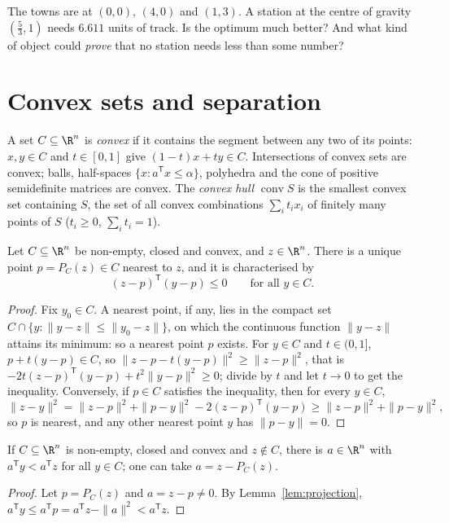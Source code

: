 \begin{think}
The towns are at $(0,0)$, $(4,0)$ and $(1,3)$. A station at the centre of gravity $(\frac53,1)$ needs $6.611$ units of track. Is the
optimum much better? And what kind of object could \emph{prove} that no station needs less than some number?
\end{think}

\section{Convex sets and separation}\label{sec:separation}

A set $C\subseteq\R^n$ is \emph{convex} if it contains the segment between any two of its points: $x,y\in C$ and $t\in[0,1]$ give $(1-t)x+ty\in C$. Intersections of convex
sets are convex; balls, half-spaces $\{x:a^{\mathsf T}x\le\alpha\}$, polyhedra and the cone of positive semidefinite matrices are convex. The \emph{convex hull} $\operatorname{conv}S$ is
the smallest convex set containing $S$, the set of all convex combinations $\sum_it_ix_i$ of finitely many points of $S$ ($t_i\ge0$, $\sum_it_i=1$).

\begin{lemma}[projection]\label{lem:projection}
Let $C\subseteq\R^n$ be non-empty, closed and convex, and $z\in\R^n$. There is a unique point $p=P_C(z)\in C$ nearest to $z$, and it is characterised by
\[
(z-p)^{\mathsf T}(y-p)\le0\qquad\text{for all }y\in C.
\]
\end{lemma}
\begin{proof}
Fix $y_0\in C$. A nearest point, if any, lies in the compact set $C\cap\{y:\|y-z\|\le\|y_0-z\|\}$, on which the continuous function $\|y-z\|$ attains its minimum: so a nearest point $p$ exists.
For $y\in C$ and $t\in(0,1]$, $p+t(y-p)\in C$, so $\|z-p-t(y-p)\|^2\ge\|z-p\|^2$, that is $-2t(z-p)^{\mathsf T}(y-p)+t^2\|y-p\|^2\ge0$; divide by $t$ and let $t\to0$ to get
the inequality. Conversely, if $p\in C$ satisfies the inequality, then for every $y\in C$,
\[
\|z-y\|^2=\|z-p\|^2+\|p-y\|^2-2(z-p)^{\mathsf T}(y-p)\ge\|z-p\|^2+\|p-y\|^2,
\]
so $p$ is nearest, and any other nearest point $y$ has $\|p-y\|=0$.
\end{proof}

\begin{theorem}\label{thm:pointsep}
If $C\subseteq\R^n$ is non-empty, closed and convex and $z\notin C$, there is $a\in\R^n$ with $a^{\mathsf T}y<a^{\mathsf T}z$ for all $y\in C$; one can take $a=z-P_C(z)$.
\end{theorem}
\begin{proof}
Let $p=P_C(z)$ and $a=z-p\ne0$. By Lemma~\ref{lem:projection}, $a^{\mathsf T}y\le a^{\mathsf T}p=a^{\mathsf T}z-\|a\|^2<a^{\mathsf T}z$.
\end{proof}

